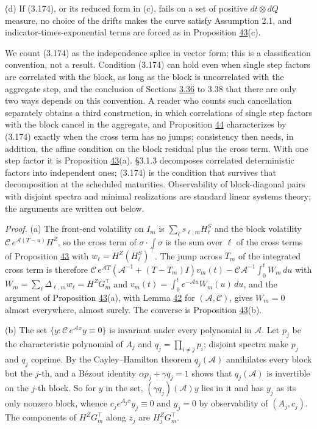 \documentclass[11pt]{article}
\begin{document}
(d) If (3.174), or its reduced form in (c), fails on a set of positive \(dt\otimes dQ\) measure, no choice of the drifts makes the curve satisfy Assumption 2.1, and indicator-times-exponential terms are forced as in Proposition \hyperref[res:Proposition-43]{43}(c).

We count (3.174) as the independence splice in vector form; this is a classification convention, not a result. Condition (3.174) can hold even when single step factors are correlated with the block, as long as the block is uncorrelated with the aggregate step, and the conclusion of Sections \hyperref[sec:3.36]{3.36} to 3.38 that there are only two ways depends on this convention. A reader who counts such cancellation separately obtains a third construction, in which correlations of single step factors with the block cancel in the aggregate, and Proposition \hyperref[res:Proposition-44]{44} characterizes by (3.174) exactly when the cross term has no jumps; consistency then needs, in addition, the affine condition on the block residual plus the cross term. With one step factor it is Proposition \hyperref[res:Proposition-43]{43}(a). \cite{gellert2021short} §3.1.3 decomposes correlated deterministic factors into independent ones; (3.174) is the condition that survives that decomposition at the scheduled maturities. Observability of block-diagonal pairs with disjoint spectra and minimal realizations are standard linear systems theory; the arguments are written out below.

\emph{Proof.} (a) The front-end volatility on \(I_m\) is \(\sum_\ell s_{\ell,m}H^S_\ell\) and the block volatility \(\mathcal C\,e^{\mathcal A(T-u)}H^Z\), so the cross term of \(\sigma\cdot\int\sigma\) is the sum over \(\ell\) of the cross terms of Proposition \hyperref[res:Proposition-43]{43} with \(w_\ell=H^Z(H^S_\ell)^\top\). The jump across \(T_m\) of the integrated cross term is therefore \(\mathcal C\,e^{\mathcal AT}(\mathcal A^{-1}+(T-T_m)I)v_m(t)-\mathcal C\mathcal A^{-1}\int_0^tW_m\,du\) with \(W_m=\sum_\ell\Delta_{\ell,m}w_\ell=H^ZG_m^\top\) and \(v_m(t)=\int_0^te^{-\mathcal Au}W_m(u)\,du\), and the argument of Proposition \hyperref[res:Proposition-43]{43}(a), with Lemma \hyperref[res:Lemma-42]{42} for \((\mathcal A,\mathcal C)\), gives \(W_m=0\) almost everywhere, almost surely. The converse is Proposition \hyperref[res:Proposition-43]{43}(b).

(b) The set \(\{y:\mathcal C\,e^{\mathcal Ax}y\equiv0\}\) is invariant under every polynomial in \(\mathcal A\). Let \(p_j\) be the characteristic polynomial of \(A_j\) and \(q_j=\prod_{i\neq j}p_i\); disjoint spectra make \(p_j\) and \(q_j\) coprime. By the Cayley--Hamilton theorem \(q_j(\mathcal A)\) annihilates every block but the \(j\)-th, and a Bézout identity \(\alpha p_j+\gamma q_j=1\) shows that \(q_j(\mathcal A)\) is invertible on the \(j\)-th block. So for \(y\) in the set, \((\gamma q_j)(\mathcal A)y\) lies in it and has \(y_j\) as its only nonzero block, whence \(c_je^{A_jx}y_j\equiv0\) and \(y_j=0\) by observability of \((A_j,c_j)\). The components of \(H^ZG_m^\top\) along \(z_j\) are \(H^Z_jG_m^\top\).
\end{document}
